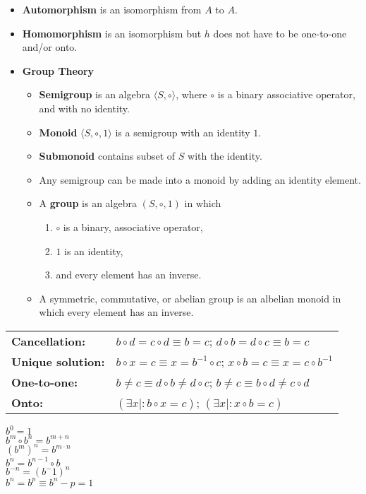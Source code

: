 \documentclass[letterpaper, 8pt]{extarticle}
\begin{document}
\begin{multicols*}{3}
\begin{itemize}
    \item \textbf{Automorphism} is an isomorphism from $A$ to $A$.
    \item \textbf{Homomorphism} is an isomorphism but $h$ does not have to be one-to-one and/or onto.

    \item \textbf{Group Theory}
        \begin{itemize}
            \item \textbf{Semigroup} is an algebra $\langle S, \circ \rangle$, where $\circ$ is a binary associative operator,
            and with no identity.
            \item \textbf{Monoid} $\langle S, \circ, 1 \rangle$ is a semigroup with an identity $1$.
            \item \textbf{Submonoid} contains subset of $S$ with the identity.
            \item Any semigroup can be made into a monoid by adding an identity element.
            \item A \textbf{group} is an algebra $(S, \circ, 1)$ in which
            \begin{enumerate}
                \item $\circ$ is a binary, associative operator,
                \item $1$ is an identity,
                \item and every element has an inverse.
            \end{enumerate}
            \item A symmetric, commutative, or abelian group is an albelian monoid in which every element has an inverse.
        \end{itemize}
    \end{itemize}

    \begin{tabulary}{\linewidth}{@{}LL@{}}
        \textbf{Cancellation:}  & $b \circ d = c \circ d \equiv b = c$; $d \circ b = d \circ c \equiv b = c$ \\
        \textbf{Unique solution:}   & $b \circ x = c \equiv x = b^{-1} \circ c$; $x \circ b = c \equiv x = c \circ b^{-1}$ \\
        \textbf{One-to-one:}    & $b \neq c \equiv d \circ b \neq d \circ c$; $b \neq c \equiv b \circ d \neq c \circ d$ \\
        \textbf{Onto:}  & $(\exists x \mid : b \circ x = c)$; $(\exists x \mid : x \circ b = c)$ \\
    \end{tabulary}
    \vspace{1em}
    \begin{multicols*}{2}
        $b^0 = 1$ \\
        $b^m \circ b^n = b^{m+n}$ \\
        $(b^m)^n = b^{m \cdot n}$ \\
        $b^n = b^{n-1} \circ b$ \\
        $b^{-n} = (b^-1)^n$ \\
        $b^n = b^p \equiv b^n-p = 1$ \\
    \end{multicols*}


\end{multicols*}
\end{document}
